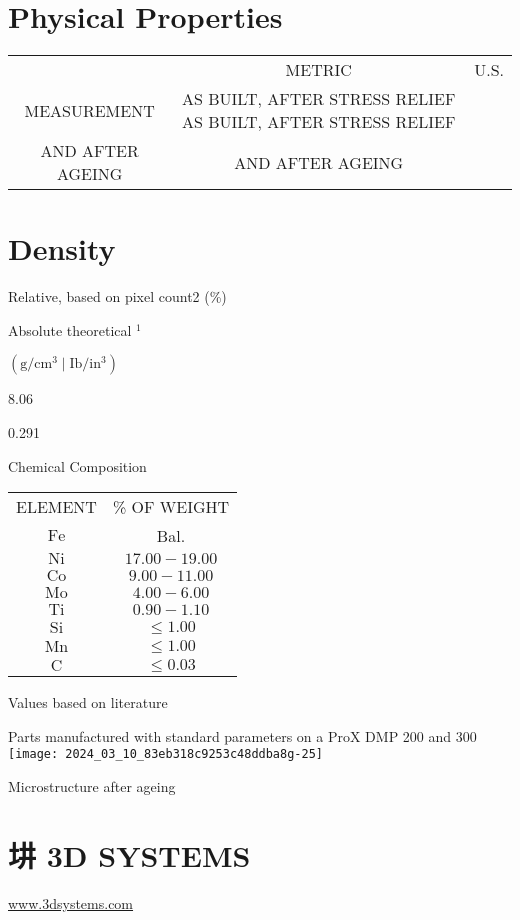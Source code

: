 \documentclass[10pt]{article}
\begin{document}
\section*{Physical Properties}
\begin{center}
\begin{tabular}{ccc}
 & METRIC & U.S. \\
MEASUREMENT & AS BUILT, AFTER STRESS RELIEF AS BUILT, AFTER STRESS RELIEF &  \\
AND AFTER AGEING & AND AFTER AGEING &  \\
\end{tabular}
\end{center}

\section*{Density}
Relative, based on pixel count2 (\%)

Absolute theoretical ${ }^{1}$

$\left(\mathrm{g} / \mathrm{cm}^{3} \mid \mathrm{Ib} / \mathrm{in}^{3}\right)$

8.06

0.291

Chemical Composition

\begin{center}
\begin{tabular}{cc}
ELEMENT & \% OF WEIGHT \\
$\mathrm{Fe}$ & Bal. \\
$\mathrm{Ni}$ & $17.00-19.00$ \\
$\mathrm{Co}$ & $9.00-11.00$ \\
$\mathrm{Mo}$ & $4.00-6.00$ \\
$\mathrm{Ti}$ & $0.90-1.10$ \\
$\mathrm{Si}$ & $\leq 1.00$ \\
$\mathrm{Mn}$ & $\leq 1.00$ \\
$\mathrm{C}$ & $\leq 0.03$ \\
\end{tabular}
\end{center}

Values based on literature

Parts manufactured with standard parameters on a ProX DMP 200 and 300\\
\texttt{[image: 2024\_03\_10\_83eb318c9253c48ddba8g-25]}

Microstructure after ageing

\section*{㘫 3D SYSTEMS}
\href{http://www.3dsystems.com}{www.3dsystems.com}
\end{document}
